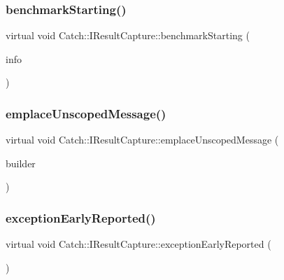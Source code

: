 \subsubsection{benchmarkStarting()}
{\footnotesize\ttfamily virtual void Catch\+::\+I\+Result\+Capture\+::benchmark\+Starting (\begin{DoxyParamCaption}\item[{Benchmark\+Info const \&}]{info }\end{DoxyParamCaption})\hspace{0.3cm}{\ttfamily [pure virtual]}}

\mbox{\label{struct_catch_1_1_i_result_capture_a49f74f1323ef8be71b8f9b8e8b2c0fc2}} 
\subsubsection{emplaceUnscopedMessage()}
{\footnotesize\ttfamily virtual void Catch\+::\+I\+Result\+Capture\+::emplace\+Unscoped\+Message (\begin{DoxyParamCaption}\item[{\textbf{ Message\+Builder} const \&}]{builder }\end{DoxyParamCaption})\hspace{0.3cm}{\ttfamily [pure virtual]}}

\mbox{\label{struct_catch_1_1_i_result_capture_ae63ecec95db4c236c63ecf616f483810}} 
\subsubsection{exceptionEarlyReported()}
{\footnotesize\ttfamily virtual void Catch\+::\+I\+Result\+Capture\+::exception\+Early\+Reported (\begin{DoxyParamCaption}{ }\end{DoxyParamCaption})\hspace{0.3cm}{\ttfamily [pure virtual]}}

\mbox{\label{struct_catch_1_1_i_result_capture_aea1617f4a84cc648246aa3ed6918b5bf}} 
